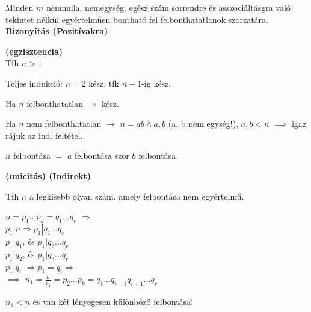 \begin{frame}
  \begin{tcolorbox}[title={Tétel: A számelmélet alaptétele}]
    Minden $m$ nemnulla, nemegység, egész szám sorrendre és asszociáltásgra való tekintet nélkül egyértelműen bontható fel felbonthatatlanok szorzatára.
  \tcblower
    \textbf{Bizonyítás (Pozitívakra)}
    \mmedskip
    
    \textbf{(egzisztencia)}\\
    Tfh $n > 1$\\
    \msmallskip
    
    Teljes indukció: $n = 2$ kész, tfk $n - 1$-ig kész.\\
    \msmallskip

    Ha $n$ felbonthatatlan $\rightarrow$ kész.\\
    \msmallskip
    
    Ha $n$ nem felbonthatatlan $\rightarrow$ $n = ab \land a, b$ (a, b nem egység!), $a, b < n$ $\implies$ igaz rájuk az ind. feltétel.\\
    \msmallskip
    
    $n$ felbontása $=$ $a$ felbontása szor $b$ felbontása.\\
    \bigskip

    \textbf{(unicitás) (Indirekt)}\\
    \msmallskip
    
    Tfh $n$ a legkisebb olyan szám, amely felbontása nem egyértelmű.\\
    \msmallskip
    
    $n = p_1 ... p_k = q_1 ... q_r$ $\Rightarrow$\\
    $p_1|n \Rightarrow p_1|q_1 ... q_r$\\
    $p_1|q_1$, és $p_1|q_2 ... q_r$\\
               \hspace{1em}$p_1|q_2$, és $ p_1|q_3 ... q_r$\\
                          \hspace{2em}$p_1|q_i$  $\Rightarrow p_1 = q_i \Rightarrow$\\
    $\implies$ $n_1 = \frac{n}{p_1} = p_2 ... p_k = q_1 ... q_{i-1}q_{i+1} ... q_r$\\
    \msmallskip
    
    $n_1 < n$ és van két lényegesen különböző felbontása!
  \end{tcolorbox}
\end{frame}

